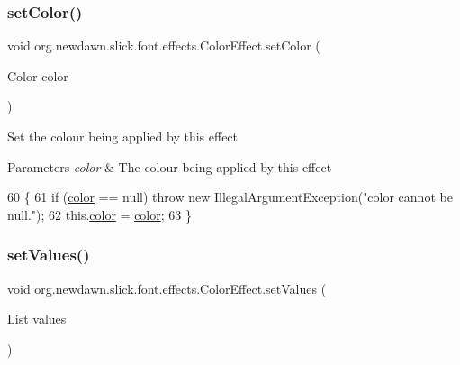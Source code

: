 \subsubsection{\texorpdfstring{set\+Color()}{setColor()}}
{\footnotesize\ttfamily void org.\+newdawn.\+slick.\+font.\+effects.\+Color\+Effect.\+set\+Color (\begin{DoxyParamCaption}\item[{Color}]{color }\end{DoxyParamCaption})\hspace{0.3cm}{\ttfamily [inline]}}

Set the colour being applied by this effect


\begin{DoxyParams}{Parameters}
{\em color} & The colour being applied by this effect \\
\hline
\end{DoxyParams}

\begin{DoxyCode}
60                                       \{
61         \textcolor{keywordflow}{if} (\mbox{\hyperlink{classorg_1_1newdawn_1_1slick_1_1font_1_1effects_1_1_color_effect_a2eb4f77d200293ea86166edce12f9817}{color}} == null) \textcolor{keywordflow}{throw} \textcolor{keyword}{new} IllegalArgumentException(\textcolor{stringliteral}{"color cannot be null."});
62         this.\mbox{\hyperlink{classorg_1_1newdawn_1_1slick_1_1font_1_1effects_1_1_color_effect_a2eb4f77d200293ea86166edce12f9817}{color}} = \mbox{\hyperlink{classorg_1_1newdawn_1_1slick_1_1font_1_1effects_1_1_color_effect_a2eb4f77d200293ea86166edce12f9817}{color}};
63     \}
\end{DoxyCode}
\mbox{\label{classorg_1_1newdawn_1_1slick_1_1font_1_1effects_1_1_color_effect_afe9ec9185b274fed7059b6d74791d089}} 
\subsubsection{\texorpdfstring{set\+Values()}{setValues()}}
{\footnotesize\ttfamily void org.\+newdawn.\+slick.\+font.\+effects.\+Color\+Effect.\+set\+Values (\begin{DoxyParamCaption}\item[{List}]{values }\end{DoxyParamCaption})\hspace{0.3cm}{\ttfamily [inline]}}

